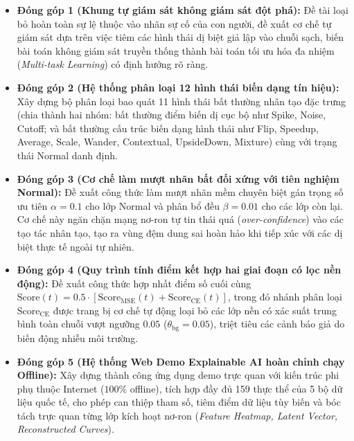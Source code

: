 \documentclass[11pt,journal,onecolumn]{IEEEtran}
\begin{document}
\begin{itemize}
    \item \textbf{Đóng góp 1 (Khung tự giám sát không giám sát đột phá):} Đề tài loại bỏ hoàn toàn sự lệ thuộc vào nhãn sự cố của con người, đề xuất cơ chế tự giám sát dựa trên việc tiêm các hình thái dị biệt giả lập vào chuỗi sạch, biến bài toán không giám sát truyền thống thành bài toán tối ưu hóa đa nhiệm (\textit{Multi-task Learning}) có định hướng rõ ràng.
    
    \item \textbf{Đóng góp 2 (Hệ thống phân loại 12 hình thái biến dạng tín hiệu):} Xây dựng bộ phân loại bao quát 11 hình thái bất thường nhân tạo đặc trưng (chia thành hai nhóm: bất thường điểm biến dị cục bộ như Spike, Noise, Cutoff; và bất thường cấu trúc biến dạng hình thái như Flip, Speedup, Average, Scale, Wander, Contextual, UpsideDown, Mixture) cùng với trạng thái Normal danh định.
    
    \item \textbf{Đóng góp 3 (Cơ chế làm mượt nhãn bất đối xứng với tiên nghiệm Normal):} Đề xuất công thức làm mượt nhãn mềm chuyên biệt gán trọng số ưu tiên $\alpha = 0.1$ cho lớp Normal và phân bổ đều $\beta = 0.01$ cho các lớp còn lại. Cơ chế này ngăn chặn mạng nơ-ron tự tin thái quá (\textit{over-confidence}) vào các tạo tác nhân tạo, tạo ra vùng đệm dung sai hoàn hảo khi tiếp xúc với các dị biệt thực tế ngoài tự nhiên.
    
    \item \textbf{Đóng góp 4 (Quy trình tính điểm kết hợp hai giai đoạn có lọc nền động):} Đề xuất công thức hợp nhất điểm số cuối cùng $\text{Score}(t) = 0.5 \cdot [\text{Score}_{\text{MSE}}(t) + \text{Score}_{\text{CE}}(t)]$, trong đó nhánh phân loại $\text{Score}_{\text{CE}}$ được trang bị cơ chế tự động loại bỏ các lớp nền có xác suất trung bình toàn chuỗi vượt ngưỡng $0.05$ ($\theta_{\text{bg}} = 0.05$), triệt tiêu các cảnh báo giả do biến động nhiễu môi trường.
    
    \item \textbf{Đóng góp 5 (Hệ thống Web Demo Explainable AI hoàn chỉnh chạy Offline):} Xây dựng thành công ứng dụng demo trực quan với kiến trúc phi phụ thuộc Internet ($100\%$ offline), tích hợp đầy đủ 159 thực thể của 5 bộ dữ liệu quốc tế, cho phép can thiệp tham số, tiêm điểm dữ liệu tùy biến và bóc tách trực quan từng lớp kích hoạt nơ-ron (\textit{Feature Heatmap, Latent Vector, Reconstructed Curves}).
\end{itemize}
\end{document}
